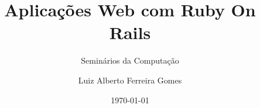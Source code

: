 \author{Luiz Alberto Ferreira Gomes}
\title{Aplicações Web com Ruby On Rails}
\subtitle{Seminários da Computação}
\date{\today}

